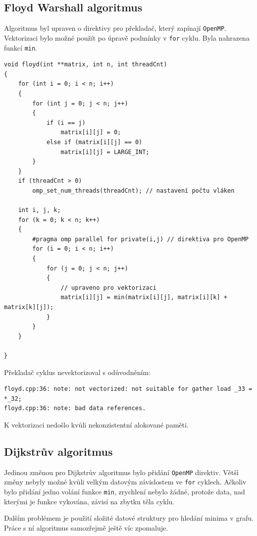 \documentclass[a4paper,10pt]{article}
\begin{document}
\subsection{Floyd Warshall algoritmus}

Algoritmus byl upraven o direktivy pro překladač, který zapínají \texttt{OpenMP}. Vektorizaci bylo možné použít po úpravě podmínky v \texttt{for} cyklu. Byla nahrazena funkcí \texttt{min}.

\begin{verbatim}
void floyd(int **matrix, int n, int threadCnt)
{
    for (int i = 0; i < n; i++)
    {
        for (int j = 0; j < n; j++)
        {
            if (i == j)
                matrix[i][j] = 0;
            else if (matrix[i][j] == 0)
                matrix[i][j] = LARGE_INT;
        }
    }
    if (threadCnt > 0)
        omp_set_num_threads(threadCnt); // nastavení počtu vláken

    int i, j, k;
    for (k = 0; k < n; k++)
    {
        #pragma omp parallel for private(i,j) // direktiva pro OpenMP
        for (i = 0; i < n; i++)
        {
            for (j = 0; j < n; j++)
            {
                // upraveno pro vektorizaci
                matrix[i][j] = min(matrix[i][j], matrix[i][k] + matrix[k][j]);
            }
        }
    }

}
\end{verbatim}

Překladač cyklus nevektorizoval s odůvodněním:

\begin{verbatim}
floyd.cpp:36: note: not vectorized: not suitable for gather load _33 = *_32;
floyd.cpp:36: note: bad data references.
\end{verbatim}

K vektorizaci nedošlo kvůli nekonzistentní alokované paměti.

\subsection{Dijkstrův algoritmus}

Jedinou změnou pro Dijkstrův algoritmus bylo přidání \texttt{OpenMP} direktiv. Větší změny nebyly možné kvůli velkým datovým závislostem ve \texttt{for} cyklech. Ačkoliv bylo přidání jedno volání funkce \texttt{min}, zrychlení nebylo žádné, protože data, nad kterými je funkce vykována, závisí na zbytku těla cyklu.

Dalším problémem je použití složité datové struktury pro hledání minima v grafu. Práce s ní algoritmus samozřejmě ještě víc zpomaluje.
\end{document}
